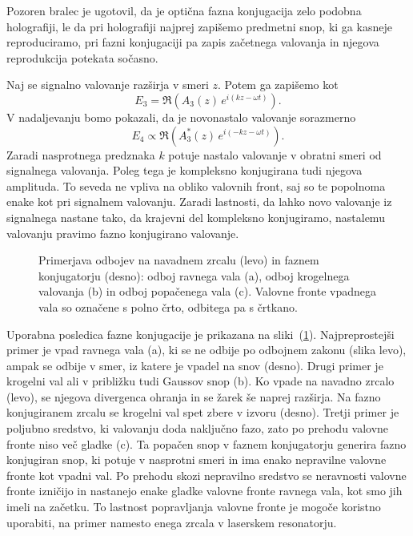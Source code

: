 \begin{remark}Pozoren bralec je ugotovil, da je optična fazna konjugacija zelo 
podobna holografiji, le da pri holografiji najprej zapišemo predmetni snop, 
ki ga kasneje reproduciramo, pri fazni konjugaciji pa zapis začetnega valovanja in 
njegova reprodukcija potekata sočasno. 
\end{remark}
Naj se signalno valovanje razširja v smeri $z$. Potem ga zapišemo kot  
\begin{equation}
E_{3}=\mathfrak{\Re}\left(A_3\left(z\right)\, e^{i\left(kz-\omega t\right)}\right).
\label{8.97}
\end{equation}
V nadaljevanju bomo pokazali, da je novonastalo valovanje sorazmerno
\begin{equation}
E_{4} \propto \mathfrak{\Re}\left(A_3^{*}\left(z\right)\, e^{i\left(-kz-\omega t\right)}\right).
\label{8.98}
\end{equation}
Zaradi nasprotnega predznaka $k$ potuje nastalo valovanje v obratni smeri od signalnega
valovanja. Poleg tega je kompleksno konjugirana tudi njegova amplituda. To seveda
ne vpliva na obliko valovnih front, saj so te popolnoma enake kot pri signalnem
valovanju. Zaradi lastnosti, da lahko novo valovanje iz signalnega nastane tako,
da krajevni del kompleksno konjugiramo, nastalemu valovanju pravimo fazno
konjugirano valovanje.
\begin{figure}[h!]
\centering
\def\svgwidth{85truemm} 

\caption{Primerjava odbojev na navadnem zrcalu (levo) in faznem konjugatorju (desno): odboj ravnega
vala (a), odboj krogelnega valovanja (b) in odboj popačenega vala (c). Valovne fronte 
vpadnega vala so označene s polno črto, odbitega pa s črtkano.}
\label{08_OPC2}
\end{figure}

Uporabna posledica fazne konjugacije je prikazana na sliki~(\ref{08_OPC2}).
Najpreprostejši primer je vpad ravnega vala (a), ki se ne odbije po odbojnem zakonu (slika levo),
ampak se odbije v smer, iz katere je vpadel na snov (desno). Drugi primer je krogelni val 
ali v približku tudi Gaussov snop (b). Ko vpade na navadno zrcalo (levo), se njegova divergenca
ohranja in se žarek še naprej razširja. Na fazno konjugiranem zrcalu se krogelni val spet
zbere v izvoru (desno). Tretji primer je poljubno sredstvo, ki valovanju doda naključno
fazo, zato po prehodu valovne fronte niso več gladke (c). Ta popačen snop v faznem
konjugatorju generira fazno konjugiran snop, ki potuje v nasprotni smeri
in ima enako nepravilne valovne fronte kot vpadni val. Po prehodu
skozi nepravilno sredstvo se neravnosti valovne fronte izničijo
in nastanejo enake gladke valovne fronte ravnega vala, kot smo jih imeli na začetku. 
To lastnost popravljanja valovne fronte je mogoče 
koristno uporabiti, na primer namesto enega zrcala v laserskem resonatorju.

